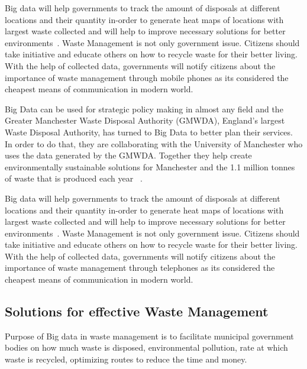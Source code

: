 \documentclass[sigconf]{acmart}
\begin{document}
Big data will help governments to track the amount of disposals at different locations and their quantity in-order to generate heat maps of locations with largest waste collected and will help to improve necessary solutions for better environments~\cite{markvan2016}. Waste Management is not only government issue. Citizens should take initiative and educate others on how to recycle waste for their better living. With the help of collected data, governments will notify citizens about the importance of waste management through mobile phones as its considered the cheapest means of communication in modern world.

Big Data can be used for strategic policy making in almost any field and the Greater Manchester Waste Disposal Authority (GMWDA), England’s largest Waste Disposal Authority, has turned to Big Data to better plan their services. In order to do that, they are collaborating with the University of Manchester who uses the data generated by the GMWDA. Together they help create environmentally sustainable solutions for Manchester and the 1.1 million tonnes of waste that is produced each year ~\cite{markvan2016}. 

Big data will help governments to track the amount of disposals at different locations and their quantity in-order to generate heat maps of locations with largest waste collected and will help to improve necessary solutions for better environments~\cite{markvan2016}. Waste Management is not only government issue. Citizens should take initiative and educate others on how to recycle waste for their better living. With the help of collected data, governments will notify citizens about the importance of waste management through telephones as its considered the cheapest means of communication in modern world.




\subsection{Solutions for effective Waste Management}


Purpose of Big data in waste management is to facilitate municipal government bodies on how much waste is disposed, environmental pollution, rate at which waste is recycled, optimizing routes to reduce the time and money.
\end{document}
